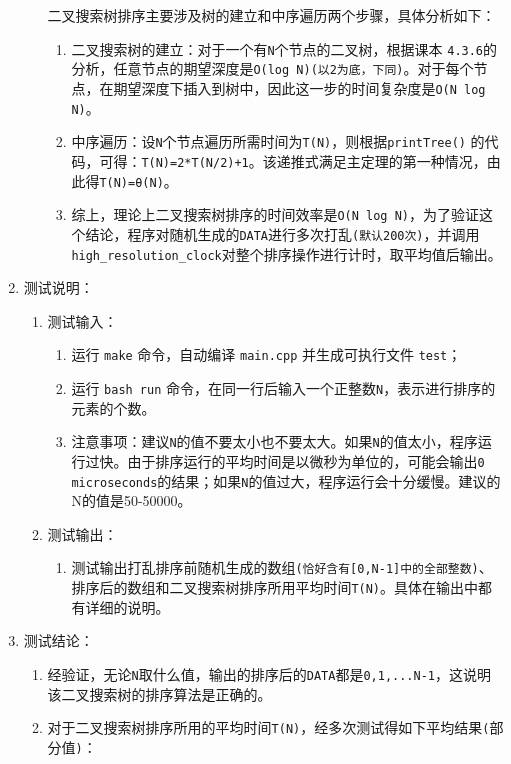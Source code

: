 \documentclass[a4paper,12pt]{article}
\begin{document}
\begin{enumerate}
\begin{enumerate}
    二叉搜索树排序主要涉及树的建立和中序遍历两个步骤，具体分析如下：
    \begin{enumerate}
        \item 二叉搜索树的建立：对于一个有\verb|N|个节点的二叉树，根据课本
        \verb|4.3.6|的分析，任意节点的期望深度是\verb|O(log N)(以2为底，下同)|。对于每个节点，在期望深度下插入到树中，因此这一步的时间复杂度是\verb|O(N log N)|。
        \item 中序遍历：设\verb|N|个节点遍历所需时间为\verb|T(N)|，则根据\verb|printTree()|
        的代码，可得：\verb|T(N)=2*T(N/2)+1|。该递推式满足主定理的第一种情况，由此得\verb|T(N)=θ(N)|。
        \item 综上，理论上二叉搜索树排序的时间效率是\verb|O(N log N)|，为了验证这个结论，程序对随机生成的\verb|DATA|进行多次打乱\verb|(默认200次)|，并调用\verb|high_resolution_clock|对整个排序操作进行计时，取平均值后输出。
    \end{enumerate}
\end{enumerate}
\item 测试说明：
\begin{enumerate}
    \item 测试输入：
    \begin{enumerate}
        \item 运行 \verb|make| 命令，自动编译 \verb|main.cpp| 并生成可执行文件 \verb|test|；
        \item 运行 \verb|bash run| 命令，{\hei 在同一行后输入一个正整数\verb|N|，表示进行排序的元素的个数}。
        \item {\hei 注意事项：建议\verb|N|的值不要太小也不要太大}。如果\verb|N|的值太小，程序运行过快。由于排序运行的平均时间是以微秒为单位的，可能会输出\verb|0 microseconds|的结果；如果\verb|N|的值过大，程序运行会十分缓慢。{\hei 建议的N的值是50-50000。}
    \end{enumerate}
    \item 测试输出：
        \begin{enumerate}
        \item 测试输出打乱排序前随机生成的数组\verb|(恰好含有[0,N-1]中的全部整数)|、排序后的数组和二叉搜索树排序所用平均时间\verb|T(N)|。具体在输出中都有详细的说明。
    \end{enumerate}
\end{enumerate}
\item 测试结论：
\begin{enumerate}
     \item 经验证，无论\verb|N|取什么值，输出的排序后的\verb|DATA|都是\verb|0,1,...N-1|，这说明{\hei 该二叉搜索树的排序算法是正确的}。
     \item 对于二叉搜索树排序所用的平均时间\verb|T(N)|，经多次测试得如下平均结果\verb|(|部分值\verb|)|：
     

\end{enumerate}
\end{enumerate}
\end{document}
